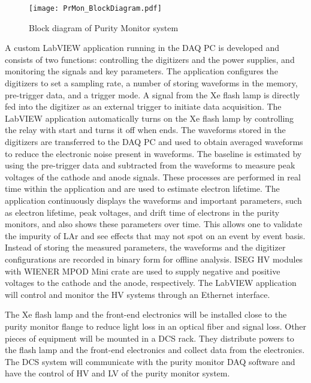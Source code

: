 \begin{figure}[h]
	\centering
	\texttt{[image: PrMon\_BlockDiagram.pdf]}
	\caption{Block diagram of Purity Monitor system}
	\label{fig:diagram}
\end{figure}

A custom LabVIEW application running in the DAQ PC is developed and consists of two functions: controlling the digitizers and the power supplies, and monitoring the signals and key parameters. The application configures the digitizers to set a sampling rate, a number of storing waveforms in the memory, pre-trigger data, and a trigger mode. A signal from the Xe flash lamp is directly fed into the digitizer as an external trigger to initiate data acquisition. The LabVIEW application automatically turns on the Xe flash lamp by controlling the relay with start and turns it off when ends. The waveforms stored in the digitizers are transferred to the DAQ PC and used to obtain averaged waveforms to reduce the electronic noise present in waveforms. The baseline is estimated by using the pre-trigger data and subtracted from the waveforms to measure peak voltages of the cathode and anode signals. These processes are performed in real time within the application and are used to estimate electron lifetime. The application continuously displays the waveforms and important parameters, such as electron lifetime, peak voltages, and drift time of electrons in the purity monitors, and also shows these parameters over time. This allows one to validate the impurity of LAr and see effects that may not spot on an event by event basis. Instead of storing the measured parameters, the waveforms and the digitizer configurations are recorded in binary form for offline analysis. ISEG HV modules with WIENER MPOD Mini crate are used to supply negative and positive voltages to the cathode and the anode, respectively. The LabVIEW application will control and monitor the HV systems through an Ethernet interface.  

The Xe flash lamp and the front-end electronics will be installed close to the purity monitor flange to reduce light loss in an optical fiber and signal loss. Other pieces of equipment will be mounted in a DCS rack. They distribute powers to the flash lamp and the front-end electronics and collect data from the electronics. The DCS system will communicate with the purity monitor DAQ software and have the control of HV and LV of the purity monitor system. 





